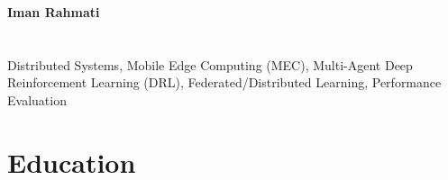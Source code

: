 \documentclass[11pt]{article}
\makeatletter
\newcommand*{\eduWithDetail}[5]
{\begin{table}[h!]
	\begin{tabular*}{\textwidth}{ll@{\extracolsep{\fill}}r}
		\textbf{#1} &  #2 & \\ %
		#3 &  & \\
		\multicolumn{3}{l}{#5}
	\end{tabular*}
\end{table}}
\newcommand*{\multilineCell}[1]
{\begin{tabular}[c]{@{}l@{}} #1
\end{tabular}}
\def\today{\number\day \space \ifcase\month\or
	Jan\or Feb\or Mar\or Apr\or May\or Jun\or
	Jul\or Aug\or Sep\or Oct\or Nov\or Dec\fi
	\space \number\year}
\makeatother
\begin{document}
	

	
%         
{\noindent \huge\bfseries Iman Rahmati}\hfill%
\vspace{-1cm}
\section{}
 \vspace{-2mm}

 Distributed Systems, Mobile Edge Computing (MEC), Multi-Agent Deep Reinforcement Learning (DRL), Federated/Distributed Learning, Performance Evaluation
\vspace{-3mm}
\section{Education}



\vspace{-5mm}
\end{document}
